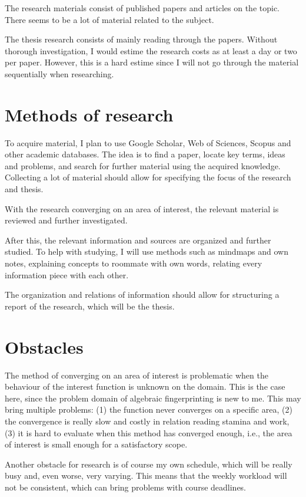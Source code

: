 \documentclass[12pt,a4paper,english,oneside]{article}
\begin{document}
The research materials consist of published papers and articles on the topic.
There seems to be a lot of material related to the subject.

The thesis research consists of mainly reading through the papers. Without thorough investigation,
I would estime the research costs as at least a day or two per paper. However, this is a hard estime
since I will not go through the material sequentially when researching.

\section{Methods of research}

To acquire material, I plan to use Google Scholar, Web of Sciences, Scopus and other academic databases.
The idea is to find a paper, locate key terms, ideas and problems, and search for further material using the acquired knowledge.
Collecting a lot of material should allow for specifying the focus of the research and thesis.

With the research converging on an area of interest, the relevant material is reviewed and further investigated.

After this, the relevant information and sources are organized and further studied.
To help with studying, I will use methods such as mindmaps and own notes, explaining concepts to roommate with own words,
relating every information piece with each other.

The organization and relations of information should allow for structuring a report of the research, which will be the thesis.

\section{Obstacles}

The method of converging on an area of interest is problematic when the behaviour of the interest function is unknown on the domain.
This is the case here, since the problem domain of algebraic fingerprinting is new to me. This may bring multiple problems:
(1) the function never converges on a specific area,
(2) the convergence is really slow and costly in relation reading stamina and work,
(3) it is hard to evaluate when this method has converged enough, i.e., the area of interest is small enough for a satisfactory scope.

Another obstacle for research is of course my own schedule, which will be really busy and, even worse, very varying.
This means that the weekly workload will not be consistent, which can bring problems with course deadlines.
\end{document}
